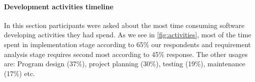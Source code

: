 \paragraph{Development activities timeline}
In this section participants were asked about the most time consuming software developing activities they had spend. As we see in \ref{fig:activities}, most of the time spent in implementation stage according to 65\% our respondents and requirement analysis stage requires second most according to 45\% response. The other usages are: Program design (37\%), project planning (30\%), testing (19\%), maintenance (17\%) etc.


